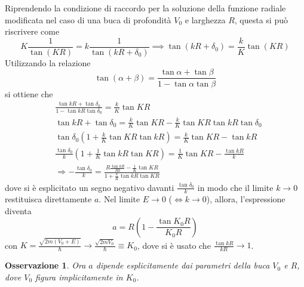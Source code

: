 \documentclass[11pt, a4paper]{scrartcl}
\theoremstyle{style}
\newtheorem{osservazione}{Osservazione}[section]
\numberwithin{equation}{subsection}
\begin{document}
Riprendendo la condizione di raccordo per la soluzione della funzione radiale modificata nel caso di una buca di profondit\`a $V_0$ e larghezza $R$, questa si pu\`o riscrivere come 
\[
K \frac{1}{\tan (KR)} = k \frac{1}{\tan(kR +\delta _0)} \implies \tan(kR+\delta _0) = \frac{k}{K} \tan (KR)
\] 
Utilizzando la relazione
\[
\tan (\alpha  + \beta ) = \frac{\tan \alpha  + \tan \beta }{1 - \tan \alpha  \tan \beta }
\] 
si ottiene che
\[
	\begin{split}
		&\frac{\tan kR + \tan \delta _0}{1 - \tan kR \tan \delta _0} = \frac{k}{K} \tan KR\\
		& \tan kR + \tan \delta _0 = \frac{k}{K} \tan KR - \frac{k}{K} \tan KR \tan kR \tan \delta _0\\
		& \tan \delta _0 \left(1+ \frac{k}{K}\tan KR \tan kR\right) = \frac{k}{K} \tan KR - \tan kR\\
		& \frac{\tan \delta _0}{k}\left(1 + \frac{1}{K} \tan k R \tan KR \right)  = \frac{1}{K} \tan KR - \frac{\tan kR}{k}\\
		&\Rightarrow - \frac{\tan \delta _0}{k} = \frac{R\frac{\tan kR}{Rk} - \frac{1}{K} \tan KR}{1 + \frac{k}{R} \tan kR \tan KR}
	\end{split}
\] 
dove si \`e esplicitato un segno negativo davanti $\frac{\tan \delta _0}{k}$ in modo che il limite $k\to 0$ restituisca direttamente $a$.
Nel limite $E\to 0$ ($\Leftrightarrow k\to 0$), allora, l'espressione diventa 
\begin{equation}
a = R \left(1 - \frac{\tan K_0 R}{ K_0 R}\right) 
\end{equation}
con $K = \frac{\sqrt{2m (V_0+E)} }{\hbar } \to \frac{\sqrt{2m V_0} }{\hbar } \equiv K_0$, dove si \`e usato che $\frac{\tan kR}{kR}\to 1$.
\begin{osservazione}
Ora $a $ dipende esplicitamente dai parametri della buca $V_0$ e $R$, dove $V_0$ figura implicitamente in $K_0$.
\end{osservazione}
\end{document}
